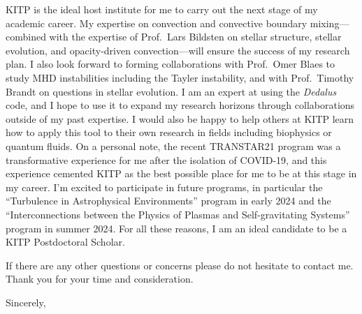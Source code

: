 \documentclass[12pt]{letter}
\begin{document}
\begin{letter}
    KITP is the ideal host institute for me to carry out the next stage of my academic career.
    My expertise on convection and convective boundary mixing---combined with the expertise of Prof.~Lars Bildsten on stellar structure, stellar evolution, and opacity-driven convection---will ensure the success of my research plan.
    I also look forward to forming collaborations with Prof.~Omer Blaes to study MHD instabilities including the Tayler instability, and with Prof.~Timothy Brandt on questions in stellar evolution.
    I am an expert at using the \emph{Dedalus} code, and I hope to use it to expand my research horizons through collaborations outside of my past expertise.
    I would also be happy to help others at KITP learn how to apply this tool to their own research in fields including biophysics or quantum fluids.
    On a personal note, the recent TRANSTAR21 program was a transformative experience for me after the isolation of COVID-19, and this experience cemented KITP as the best possible place for me to be at this stage in my career.
    I'm excited to participate in future programs, in particular the ``Turbulence in Astrophysical Environments'' program in early 2024 and the ``Interconnections between the Physics of Plasmas and Self-gravitating Systems'' program in summer 2024.
    For all these reasons, I am an ideal candidate to be a KITP Postdoctoral Scholar.


    If there are any other questions or concerns please do not hesitate to contact me.
    Thank you for your time and consideration.

\closing{Sincerely,}
\vspace{-0.9in}
\\
\end{letter}
\end{document}
